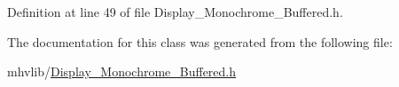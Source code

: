 Definition at line 49 of file Display\-\_\-\-Monochrome\-\_\-\-Buffered.\-h.



The documentation for this class was generated from the following file\-:\begin{DoxyCompactItemize}
\item 
mhvlib/\hyperlink{_display___monochrome___buffered_8h}{Display\-\_\-\-Monochrome\-\_\-\-Buffered.\-h}\end{DoxyCompactItemize}
